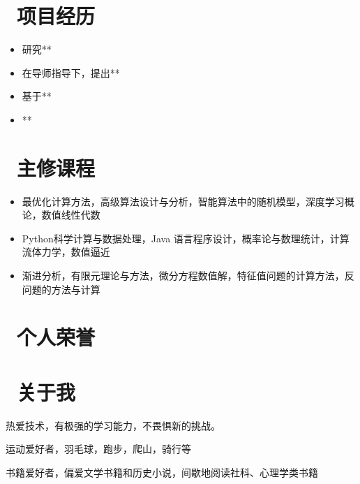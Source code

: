 \documentclass[14pt]{resume}
\begin{document}
\section{\faUsers\ 项目经历}

\begin{onehalfspacing}
\begin{itemize}
    \item[\faFlagO] 研究**
    \item[\faCode] 在导师指导下，提出**
\end{itemize}
\end{onehalfspacing}

\begin{onehalfspacing}
\begin{itemize}
    \item[\faFlagO] 基于**
    \item[\faCode] **
\end{itemize}
\end{onehalfspacing}


\section{\faUniversity\ 主修课程}

\begin{onehalfspacing}
\begin{itemize}
    \item[\faFlagO] 最优化计算方法，高级算法设计与分析，智能算法中的随机模型，深度学习概论，数值线性代数
    \item[\faFlagO] Python科学计算与数据处理，Java 语言程序设计，概率论与数理统计，计算流体力学，数值逼近
    \item[\faFlagO] 渐进分析，有限元理论与方法，微分方程数值解，特征值问题的计算方法，反问题的方法与计算
\end{itemize}
\end{onehalfspacing}

\section{\faHeartO\ 个人荣誉}









\section{\faInfo\ 关于我}

\faTerminal 热爱技术，有极强的学习能力，不畏惧新的挑战。

\faHeartbeat 运动爱好者，羽毛球，跑步，爬山，骑行等

\faBook 书籍爱好者，偏爱文学书籍和历史小说，间歇地阅读社科、心理学类书籍
\end{document}
